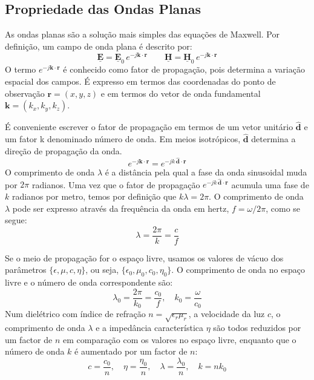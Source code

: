 \subsection{Propriedade das Ondas Planas}
As ondas planas são a solução mais simples das equações de Maxwell. Por definição, um campo de onda plana é descrito por:
\begin{equation}
    \underline{\mathbf{E}} = \underline{\mathbf{E}}_0\, e^{-j \mathbf{k}\cdot\mathbf{r}}\qquad
    \underline{\mathbf{H}} = \underline{\mathbf{H}}_0\, e^{-j \mathbf{k}\cdot\mathbf{r}}
\end{equation}
O termo $e^{-j \mathbf{k}\cdot\mathbf{r}}$ é conhecido como fator de propagação, pois determina a variação espacial dos campos. É expresso em termos das coordenadas do ponto de observação $\mathbf{r} = (x, y, z)$ e em termos do vetor de onda fundamental $\mathbf{k} = (k_x, k_y, k_z)$.

É conveniente escrever o fator de propagação em termos de um vetor unitário $\mathbf{\hat{d}}$ e um fator k denominado número de onda. Em meios isotrópicos, $\mathbf{\hat{d}}$ determina a direção de propagação da onda.
\begin{equation}
    \boxed{e^{-j \mathbf{k}\cdot\mathbf{r}} = e^{-j k\,\mathbf{\hat{d}}\cdot\mathbf{r}}}
\end{equation}
O comprimento de onda $\lambda$ é a distância pela qual a fase da onda sinusoidal muda por $2\pi$ radianos. Uma vez que o fator de propagação $e^{-j k\,\mathbf{\hat{d}}\cdot\mathbf{r}}$ acumula uma fase de $k$ radianos por metro, temos por definição que $k\lambda = 2\pi$. O comprimento de onda $\lambda$ pode ser expresso através da frequência da onda em hertz, $f = \omega/2\pi$, como se segue:
\begin{equation}
    \boxed{\lambda = \frac{2\pi}{k} = \frac{c}{f}}
\end{equation}

\begin{warning}
    Se o meio de propagação for o espaço livre, usamos os valores de vácuo dos parâmetros $\{\epsilon, \mu, c, \eta\}$, ou seja, $\{\epsilon_0, \mu_0, c_0, \eta_0\}$. O comprimento de onda no espaço livre e o número de onda correspondente são:
    \begin{equation}
        \lambda_0 = \frac{2\pi}{k_0} = \frac{c_0}{f} , \quad k_0 = \frac{\omega}{c_0}  
    \end{equation}
    Num dielétrico com índice de refração $n = \sqrt{\epsilon_r\mu_r}$, a velocidade da luz $c$, o comprimento de onda $\lambda$ e a impedância característica $\eta$ são todos reduzidos por um factor de $n$ em comparação com os valores no espaço livre, enquanto que o número de onda $k$ é aumentado por um factor de $n$:
    \begin{equation}
        c = \dfrac{c_0}{n}, \quad\eta = \dfrac{\eta_0}{n}, \quad\lambda = \dfrac{\lambda_0}{n}, \quad k = nk_0
    \end{equation}
\end{warning}

